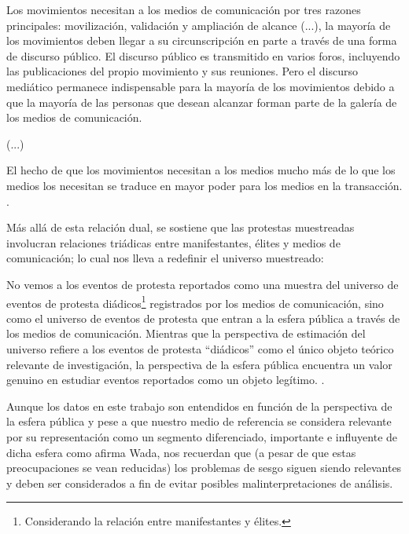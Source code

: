 \documentclass[letterpaper, 11pt]{book}
\theoremstyle{definition}
\theoremstyle{remark}
\begin{document}
\begin{center}
    \begin{minipage}{0.9\linewidth}
        {\setlength{\parindent}{12pt}\small
        Los movimientos necesitan a los medios de comunicación por tres razones principales: movilización, validación y ampliación de alcance (...), la mayoría de los movimientos deben llegar a su circunscripción en parte a través de una forma de discurso público. 
        El discurso público es transmitido en varios foros, incluyendo las publicaciones del propio movimiento y sus reuniones. 
        Pero el discurso mediático permanece indispensable para la mayoría de los movimientos debido a que la mayoría de las personas que desean alcanzar forman parte de la galería de los medios de comunicación.
        
        (...)
        
        El hecho de que los movimientos necesitan a los medios mucho más de lo que los 	medios los necesitan se traduce en mayor poder para los medios en la transacción. \normalsize \citep[116]{1993_Gamson_medios}.
        }
    \end{minipage}
\end{center}

Más allá de esta relación dual, se sostiene que las protestas muestreadas involucran relaciones triádicas entre manifestantes, élites y medios de comunicación; lo cual nos lleva a redefinir el universo muestreado:


\begin{center}
    \begin{minipage}{0.9\linewidth}
        {\setlength{\parindent}{12pt}\small
        No vemos a los eventos de protesta reportados como una muestra del universo de eventos de protesta diádicos\footnote{Considerando la relación entre manifestantes y élites.} registrados por los medios de comunicación, sino como el universo de eventos de protesta que entran a la esfera pública a través de los medios de comunicación. 
        Mientras que la perspectiva de estimación del universo refiere a los eventos de protesta ``diádicos'' como el único objeto teórico relevante de investigación, la perspectiva de la esfera pública encuentra un valor genuino en estudiar eventos reportados como un objeto legítimo. \normalsize \citep[108]{2003_Wada_Tesis}.
        }
    \end{minipage}
\end{center}


Aunque los datos en este trabajo son entendidos en función de la perspectiva de la esfera pública y pese a que nuestro medio de referencia se considera relevante por su representación como un segmento diferenciado, importante e influyente de dicha esfera como afirma Wada, \citet{2005_Ortiz_NewspaperData} nos recuerdan que (a pesar de que estas preocupaciones se vean reducidas) los problemas de sesgo siguen siendo relevantes y deben ser considerados a fin de evitar posibles malinterpretaciones de análisis.
\end{document}
